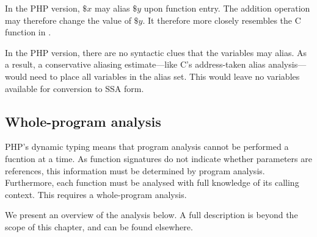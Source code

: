In the PHP version, $\$x$ may alias $\$y$ upon function entry.
The addition operation may therefore change the value of $\$y$.
It therefore more closely resembles the C function in .

In the PHP version, there are no syntactic clues that the variables may alias.
As a result, a conservative aliasing estimate---like C's address-taken alias analysis---would need to place all variables in the alias set.
This would leave no variables available for conversion to SSA form.


\subsection{Whole-program analysis}

PHP's dynamic typing means that program analysis cannot be performed a fucntion at a time.
As function signatures do not indicate whether parameters are references, this information must be determined by program analysis.
Furthermore, each function must be analysed with full knowledge of its calling context.
This requires a whole-program analysis.

We present an overview of the analysis below.
A full description is beyond the scope of this chapter, and can be found elsewhere\cite{thesis}.


